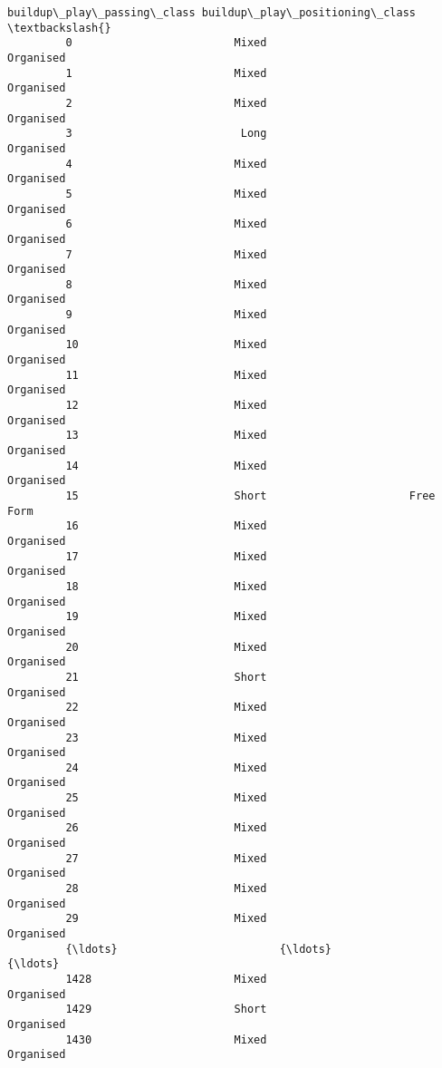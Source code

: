 \documentclass[11pt]{article}
\begin{document}
\begin{Verbatim}[commandchars=\\\{\}]
              buildup\_play\_passing\_class buildup\_play\_positioning\_class  \textbackslash{}
         0                         Mixed                      Organised   
         1                         Mixed                      Organised   
         2                         Mixed                      Organised   
         3                          Long                      Organised   
         4                         Mixed                      Organised   
         5                         Mixed                      Organised   
         6                         Mixed                      Organised   
         7                         Mixed                      Organised   
         8                         Mixed                      Organised   
         9                         Mixed                      Organised   
         10                        Mixed                      Organised   
         11                        Mixed                      Organised   
         12                        Mixed                      Organised   
         13                        Mixed                      Organised   
         14                        Mixed                      Organised   
         15                        Short                      Free Form   
         16                        Mixed                      Organised   
         17                        Mixed                      Organised   
         18                        Mixed                      Organised   
         19                        Mixed                      Organised   
         20                        Mixed                      Organised   
         21                        Short                      Organised   
         22                        Mixed                      Organised   
         23                        Mixed                      Organised   
         24                        Mixed                      Organised   
         25                        Mixed                      Organised   
         26                        Mixed                      Organised   
         27                        Mixed                      Organised   
         28                        Mixed                      Organised   
         29                        Mixed                      Organised   
         {\ldots}                         {\ldots}                            {\ldots}   
         1428                      Mixed                      Organised   
         1429                      Short                      Organised   
         1430                      Mixed                      Organised   

\end{Verbatim}
\end{document}
